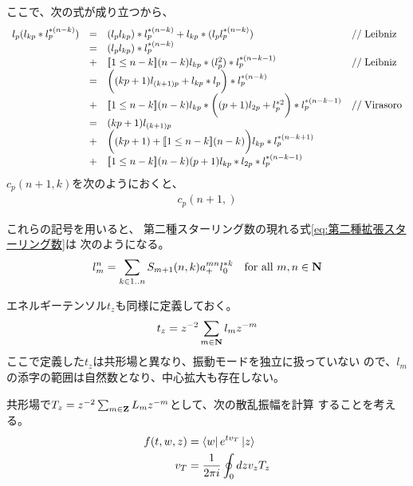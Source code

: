 	ここで、次の式が成り立つから、
	\begin{equation*}\begin{array}{rcll} %
		l_p(l_{kp}*l_p^{*(n-k)})
		&=& (l_pl_{kp})*l_p^{*(n-k)} + l_{kp}*(l_pl_p^{*(n-k)})
		&\lcomment{Leibniz} \\
		&=& (l_pl_{kp})*l_p^{*(n-k)}  \\
		&+& \jump{1\le n-k}(n-k)l_{kp}*(l_p^2)*l_p^{*(n-k-1)}
		&\lcomment{Leibniz} \\
		&=& \biggl((kp+1)l_{(k+1)p} + l_{kp}*l_p\biggr)*l_p^{*(n-k)} \\
		&+& \jump{1\le n-k}(n-k)l_{kp}*\biggl((p+1)l_{2p} + l_p^{*2}\biggr)
			*l_p^{*(n-k-1)}
		&\lcomment{Virasoro} \\
		&=& (kp+1)l_{(k+1)p} \\
		&+& \biggl((kp+1) + \jump{1\le n-k}(n-k)\biggr)l_{kp}*l_p^{*(n-k+1)} \\
		&+& \jump{1\le n-k}(n-k)(p+1)l_{kp}*l_{2p}*l_p^{*(n-k-1)} \\
	\end{array}\end{equation*} %
	$c_p(n+1,k)$を次のようにおくと、
	\begin{equation*}\begin{split} %
		c_p(n+1,)
	\end{split}\end{equation*} %

	\begin{todo}[作用素積展開]\label{todo:作用素積展開} %
		これらの記号を用いると、
		第二種スターリング数の現れる式\ref{eq:第二種拡張スターリング数}は
		次のようになる。
		\begin{equation*}\begin{split} %
			l_m^n = \sum_{k\in1..n} S_{m+1}(n,k) a_+^{mn}l_0^{*k}
			\quad\text{for all }m,n\in\sizen
		\end{split}\end{equation*} %

		エネルギーテンソル$t_z$も同様に定義しておく。
		\begin{equation*}\begin{split} %
			t_z &= z^{-2}\sum_{m\in\sizen}l_mz^{-m} \\
		\end{split}\end{equation*} %
		ここで定義した$t_z$は共形場と異なり、振動モードを独立に扱っていない
		ので、$l_m$の添字の範囲は自然数となり、中心拡大も存在しない。

		共形場で$T_z=z^{-2}\sum_{m\in{\ensuremath{\mathbf{Z}}}}L_mz^{-m}$として、次の散乱振幅を計算
		することを考える。
		\begin{equation*}\begin{split} %
			f(t,w,z) &= \bra{w}e^{tv_T}\ket{z} \\
			v_T &= \frac{1}{2\pi i}\oint_0 dz v_zT_z \\
		\end{split}\end{equation*} %
	\end{todo} %
\endgroup %
